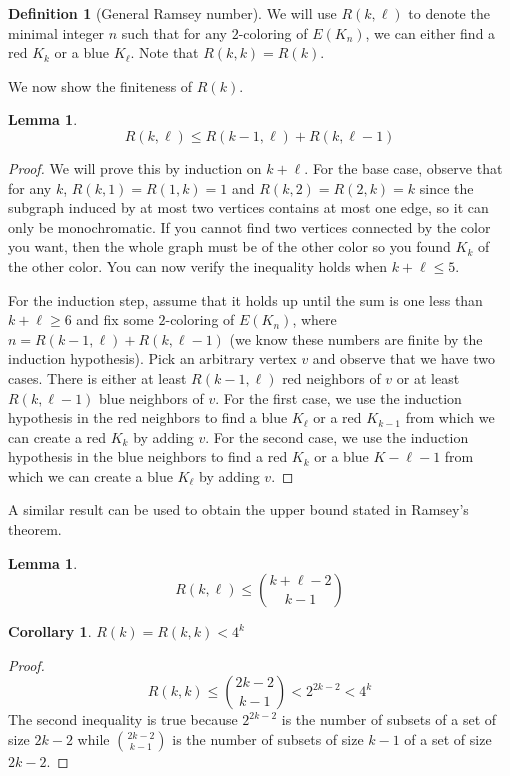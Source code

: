 \documentclass{tufte-handout}
\newtheorem{cor}[thm]{Corollary}
\newtheorem{lem}[thm]{Lemma}
\theoremstyle{definition}
\newtheorem{defn}[thm]{Definition}
\theoremstyle{remark}
\begin{document}
\begin{defn}[General Ramsey number]
	We will use $R(k,\ell)$ to denote the minimal integer $n$ such that for any $2$-coloring of $E(K_n)$, we can either find a red $K_k$ or a blue $K_{\ell}$. Note that $R(k,k) = R(k)$. 
\end{defn}
We now show the finiteness of $R(k)$.
\begin{lem}
	\[R(k,\ell) \leq R(k-1, \ell) + R(k, \ell-1)\]
\end{lem}
\begin{proof}
	We will prove this by induction on $k+\ell$. For the base case, observe that for any $k$, $R(k,1) = R(1,k) = 1$ and $R(k,2) = R(2,k) = k$ since the subgraph induced by at most two vertices contains at most one edge, so it can only be monochromatic. If you cannot find two vertices connected by the color you want, then the whole graph must be of the other color so you found $K_k$ of the other color. You can now verify the inequality holds when $k+\ell \leq 5$.
	
	For the induction step, assume that it holds up until the sum is one less than $k+\ell \geq 6$ and fix some $2$-coloring of $E(K_n)$, where $n = R(k-1,\ell) + R(k, \ell -1)$ (we know these numbers are finite by the induction hypothesis). Pick an arbitrary vertex $v$ and observe that we have two cases. There is either at least $R(k-1,\ell)$ red neighbors of $v$ or at least $R(k,\ell-1)$ blue neighbors of $v$. For the first case, we use the induction hypothesis in the red neighbors to find a blue $K_{\ell}$ or a red $K_{k-1}$ from which we can create a red $K_k$ by adding $v$. For the second case, we use the induction hypothesis in the blue neighbors to find a red $K_k$ or a blue $K-{\ell-1}$ from which we can create a blue $K_{\ell}$ by adding $v$.
\end{proof}
A similar result can be used to obtain the upper bound stated in Ramsey's theorem.
\begin{lem}
	\[R(k,\ell) \leq \binom{k+\ell-2}{k-1}\]
\end{lem}
\begin{cor}
	$R(k) = R(k,k) < 4^k$
\end{cor}
\begin{proof}
	\[R(k,k) \leq \binom{2k-2}{k-1} < 2^{2k-2} < 4^k \]
	The second inequality is true because $2^{2k-2}$ is the number of subsets of a set of size $2k-2$ while $\binom{2k-2}{k-1}$ is the number of subsets of size $k-1$ of a set of size $2k-2$.
\end{proof}
\end{document}
